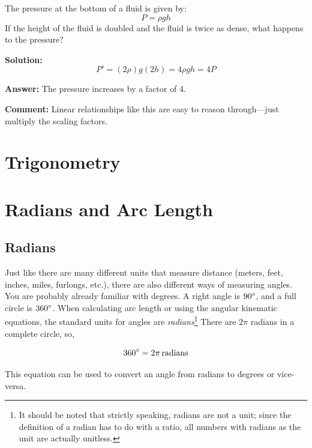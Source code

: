 	The pressure at the bottom of a fluid is given by:
	\[
	P = \rho g h
	\]
	If the height of the fluid is doubled and the fluid is twice as dense, what happens to the pressure?


\textbf{Solution:}
\[
P' = (2\rho) g (2h) = 4 \rho g h = 4P
\]

\textbf{Answer:} The pressure increases by a factor of 4.

\textbf{Comment:} Linear relationships like this are easy to reason through—just multiply the scaling factors.


\newpage
\section{Trigonometry} 


\newpage
\section {Radians and Arc Length}
\subsection{Radians} 

Just like there are many different units that measure distance (meters, feet, inches, miles, furlongs, etc.), there are also different ways of measuring angles.  You are probably already familiar with degrees. A right angle is $90 \degree$, and a full circle is $360 \degree$.  When calculating arc length or using the angular kinematic equations, the standard units for angles are \textit{radians}\footnote{It should be noted that strictly speaking, radians are not a unit; since the definition of a radian has to do with a ratio, all numbers with radians as the unit are actually unitless.}  There are $2 \pi$ radians in a complete circle, so,

	\begin{mdframed}[backgroundcolor=green!20!white]
	\begin{equation*}
		360 \degree = 2 \pi \, \si{radians}
		\label{conversion:radiandegree}
	\end{equation*}
\end{mdframed}	

This equation can be used to convert an angle from radians to degrees or vice-versa.  

